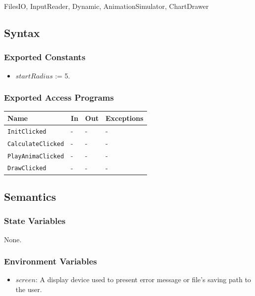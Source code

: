 \documentclass[12pt, titlepage]{article}
\begin{document}
FilesIO, InputReader, Dynamic, AnimationSimulator, ChartDrawer

\subsection{Syntax}

\subsubsection{Exported Constants}

\begin{itemize}
\item $startRadius$ := 5.
\end{itemize}

\subsubsection{Exported Access Programs}

\begin{center}
\begin{tabular}{p{4cm} p{4cm} p{4cm} p{2cm}}
\hline
\textbf{Name} & \textbf{In} & \textbf{Out} & \textbf{Exceptions} \\
\hline
\texttt{InitClicked} & - & - & - \\
\texttt{CalculateClicked} & - & - & - \\
\texttt{PlayAnimaClicked} & - & - & - \\
\texttt{DrawClicked} & - & - & - \\
\hline
\end{tabular}
\end{center}

\subsection{Semantics}

\subsubsection{State Variables}

None.

\subsubsection{Environment Variables}
\begin{itemize}
\item $screen$: A display device used to present error message or file's 
saving path to the user. 
\end{itemize}
\end{document}
